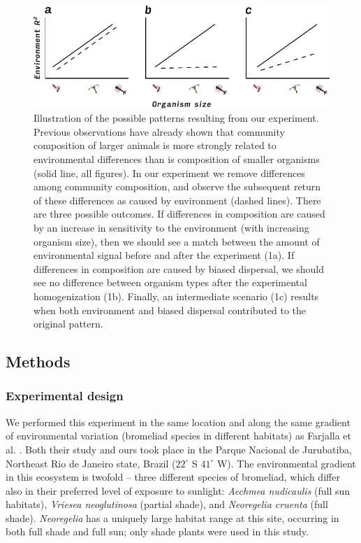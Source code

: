 \begin{figure}[htbp]
\centering
\includegraphics[width=5.5in]{figures/hypotheses_illustration.pdf}
\caption[Illustration of the possible patterns resulting from our
experiment.]{Illustration of the possible patterns resulting from our
experiment. Previous observations have already shown that community
composition of larger animals is more strongly related to environmental
differences than is composition of smaller organisms (solid line, all
figures). In our experiment we remove differences among community
composition, and observe the subsequent return of these differences as
caused by environment (dashed lines). There are three possible outcomes.
If differences in composition are caused by an increase in sensitivity
to the environment (with increasing organism size), then we should see a
match between the amount of environmental signal before and after the
experiment (1a). If differences in composition are caused by biased
dispersal, we should see no difference between organism types after the
experimental homogenization (1b). Finally, an intermediate scenario (1c)
results when both environment and biased dispersal contributed to the
original pattern.}
\label{fig:illustration}
\end{figure}

\subsection{Methods}\label{methods}

\subsubsection{Experimental design}\label{experimental-design}

We performed this experiment in the same location and along the same
gradient of environmental variation (bromeliad species in different
habitats) as Farjalla et al. \citeyearpar{Farjalla2012}. Both their
study and ours took place in the Parque Nacional de Jurubatiba,
Northeast Rio de Janeiro state, Brazil (\(22^{\circ}\) S \(41^{\circ}\)
W). The environmental gradient in this ecosystem is twofold -- three
different species of bromeliad, which differ also in their preferred
level of exposure to sunlight: \emph{Aechmea nudicaulis} (full sun
habitats), \emph{Vriesea neoglutinosa} (partial shade), and
\emph{Neoregelia cruenta} (full shade). \emph{Neoregelia} has a uniquely
large habitat range at this site, occurring in both full shade and full
sun; only shade plants were used in this study.

